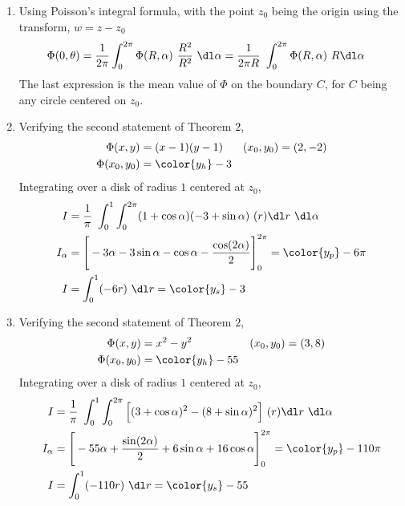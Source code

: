 \begin{enumerate}
    \item Using Poisson's integral formula, with the point $ z_0 $ being the origin
          using the transform, $ w = z - z_0 $
          \begin{align}
              \Phi(0, \theta) & = \frac{1}{2\pi} \int_{0}^{2\pi} \Phi(R, \alpha)
              \ \frac{R^2}{R^2}\ \dl \alpha = \frac{1}{2\pi R}
              \ \int_{0}^{2\pi} \Phi(R, \alpha)\ R \dl \alpha
          \end{align}
          The last expression is the mean value of $ \Phi $ on the boundary $ C $, for
          $ C $ being any circle centered on $ z_0 $.

    \item Verifying the second statement of Theorem $ 2 $,
          \begin{align}
              \Phi(x,y)      & = (x-1)(y-1)     &
              (x_0, y_0)     & = (2, -2)          \\
              \Phi(x_0, y_0) & = \color{y_h} -3
          \end{align}
          Integrating over a disk of radius $ 1 $ centered at $ z_0 $,
          \begin{align}
              I        & = \frac{1}{\pi}\ \int_{0}^{1} \int_{0}^{2\pi}
              (1 + \cos\alpha)(-3 + \sin\alpha)\ (r)\dl r\ \dl \alpha     \\
              I_\alpha & = \Bigg[ -3\alpha - 3\sin\alpha - \cos\alpha -
              \frac{\cos(2\alpha)}{2} \Bigg]_0^{2\pi} = \color{y_p} -6\pi \\
              I        & = \int_{0}^{1} (-6r)\ \dl r = \color{y_s} -3
          \end{align}

    \item Verifying the second statement of Theorem $ 2 $,
          \begin{align}
              \Phi(x,y)      & = x^2 - y^2       &
              (x_0, y_0)     & = (3, 8)            \\
              \Phi(x_0, y_0) & = \color{y_h} -55
          \end{align}
          Integrating over a disk of radius $ 1 $ centered at $ z_0 $,
          \begin{align}
              I        & = \frac{1}{\pi}\ \int_{0}^{1} \int_{0}^{2\pi}
              \Big[(3 + \cos\alpha)^2 - (8 + \sin\alpha)^2\Big]\ (r)\dl r\ \dl \alpha \\
              I_\alpha & = \Bigg[ -55\alpha + \frac{\sin(2\alpha)}{2}
              + 6\sin\alpha + 16\cos\alpha \Bigg]_0^{2\pi} = \color{y_p} -110\pi      \\
              I        & = \int_{0}^{1} (-110r)\ \dl r = \color{y_s} -55
          \end{align}


\end{enumerate}
